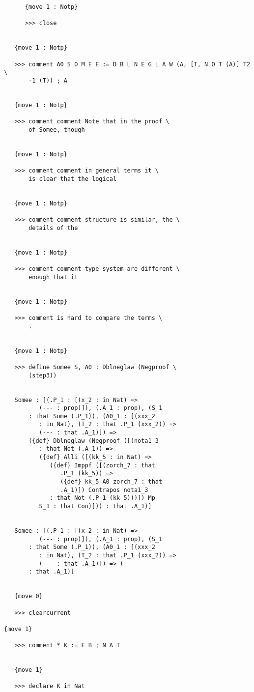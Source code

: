\documentclass{article}
\begin{document}
\begin{verbatim}
      {move 1 : Notp}

      >>> close


   {move 1 : Notp}

   >>> comment A0 S O M E E := D B L N E G L A W (A, [T, N O T (A)] T2 \
       -1 (T)) ; A


   {move 1 : Notp}

   >>> comment comment Note that in the proof \
       of Somee, though


   {move 1 : Notp}

   >>> comment comment in general terms it \
       is clear that the logical


   {move 1 : Notp}

   >>> comment comment structure is similar, the \
       details of the


   {move 1 : Notp}

   >>> comment comment type system are different \
       enough that it


   {move 1 : Notp}

   >>> comment is hard to compare the terms \
       .


   {move 1 : Notp}

   >>> define Somee S, A0 : Dblneglaw (Negproof \
       (step3))


   Somee : [(.P_1 : [(x_2 : in Nat) => 
          (--- : prop)]), (.A_1 : prop), (S_1 
       : that Some (.P_1)), (A0_1 : [(xxx_2 
          : in Nat), (T_2 : that .P_1 (xxx_2)) => 
          (--- : that .A_1)]) => 
       ({def} Dblneglaw (Negproof ([(nota1_3 
          : that Not (.A_1)) => 
          ({def} Alli ([(kk_5 : in Nat) => 
             ({def} Imppf ([(zorch_7 : that 
                .P_1 (kk_5)) => 
                ({def} kk_5 A0 zorch_7 : that 
                .A_1)]) Contrapos nota1_3 
             : that Not (.P_1 (kk_5)))]) Mp 
          S_1 : that Con)])) : that .A_1)]


   Somee : [(.P_1 : [(x_2 : in Nat) => 
          (--- : prop)]), (.A_1 : prop), (S_1 
       : that Some (.P_1)), (A0_1 : [(xxx_2 
          : in Nat), (T_2 : that .P_1 (xxx_2)) => 
          (--- : that .A_1)]) => (--- 
       : that .A_1)]


   {move 0}

   >>> clearcurrent

{move 1}

   >>> comment * K := E B ; N A T


   {move 1}

   >>> declare K in Nat



\end{verbatim}
\end{document}
